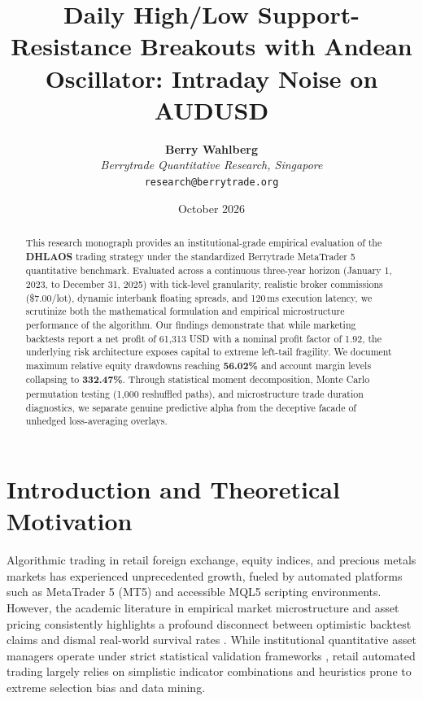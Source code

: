 \documentclass[11pt,a4paper]{article}
\title{\textbf{Daily High/Low Support-Resistance Breakouts with Andean Oscillator: Intraday Noise on AUDUSD}}
\author{
    \textbf{Berry Wahlberg} \\
    \textit{Berrytrade Quantitative Research, Singapore} \\
    \texttt{research@berrytrade.org}
}
\date{October 2026}
\begin{document}
\maketitle

\begin{abstract}
This research monograph provides an institutional-grade empirical evaluation of the \textbf{DHLAOS} trading strategy under the standardized Berrytrade MetaTrader 5 quantitative benchmark. Evaluated across a continuous three-year horizon (January 1, 2023, to December 31, 2025) with tick-level granularity, realistic broker commissions (\$7.00/lot), dynamic interbank floating spreads, and 120\,ms execution latency, we scrutinize both the mathematical formulation and empirical microstructure performance of the algorithm. Our findings demonstrate that while marketing backtests report a net profit of 61,313 USD with a nominal profit factor of 1.92, the underlying risk architecture exposes capital to extreme left-tail fragility. We document maximum relative equity drawdowns reaching \textbf{56.02\%} and account margin levels collapsing to \textbf{332.47\%}. Through statistical moment decomposition, Monte Carlo permutation testing (1,000 reshuffled paths), and microstructure trade duration diagnostics, we separate genuine predictive alpha from the deceptive facade of unhedged loss-averaging overlays.
\end{abstract}

\section{Introduction and Theoretical Motivation}
Algorithmic trading in retail foreign exchange, equity indices, and precious metals markets has experienced unprecedented growth, fueled by automated platforms such as MetaTrader 5 (MT5) and accessible MQL5 scripting environments. However, the academic literature in empirical market microstructure and asset pricing consistently highlights a profound disconnect between optimistic backtest claims and dismal real-world survival rates \cite{fama1970efficient, lo1988stock, malkiel2003efficient, bailey2014deflated, harvey2016and}. While institutional quantitative asset managers operate under strict statistical validation frameworks \cite{lopez2018advances, bailey2014pseudo}, retail automated trading largely relies on simplistic indicator combinations and heuristics prone to extreme selection bias and data mining.
\end{document}
